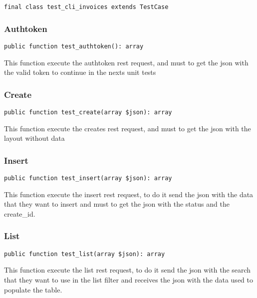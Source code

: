 \documentclass[a4paper]{article}
\begin{document}
\begin{lstlisting}
final class test_cli_invoices extends TestCase
\end{lstlisting}

\hypertarget{toc74}{}
\subsubsection{Authtoken}

\begin{lstlisting}
public function test_authtoken(): array
\end{lstlisting}

This function execute the authtoken rest request, and must to get the
json with the valid token to continue in the nexts unit tests

\hypertarget{toc75}{}
\subsubsection{Create}

\begin{lstlisting}
public function test_create(array $json): array
\end{lstlisting}

This function execute the creates rest request, and must to get the
json with the layout without data

\hypertarget{toc76}{}
\subsubsection{Insert}

\begin{lstlisting}
public function test_insert(array $json): array
\end{lstlisting}

This function execute the insert rest request, to do it send the json with
the data that they want to insert and must to get the json with the status
and the create\_id.

\hypertarget{toc77}{}
\subsubsection{List}

\begin{lstlisting}
public function test_list(array $json): array
\end{lstlisting}

This function execute the list rest request, to do it send the json with
the search that they want to use in the list filter and receives the json
with the data used to populate the table.
\end{document}
